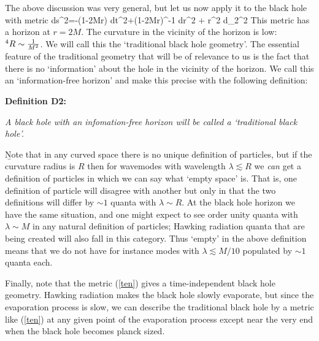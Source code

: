 \documentclass[12pt]{article}
\begin{document}
The above discussion was very general, but let us now apply it to the black hole with metric
\be
ds^2=-(1-{2M\over r}) dt^2+(1-{2M\over r})^{-1} dr^2 + r^2 d\Omega_2^2
\label{ten}
\ee
This metric has a horizon at $r=2M$. The curvature in the vicinity of the horizon is low: ${}^4R\sim {1\over M^2}$. We will call this the `traditional black hole geometry'. The essential feature of the traditional geometry that will be of relevance to us is the fact that  there is no `information' about the hole in the vicinity of the horizon. We call this an `information-free horizon' and make this precise with the following definition:

\b

{\bf Definition D2:} 

\b

{\it A black hole with an infomation-free horizon will be called a `traditional black hole'.}

\b

 Note that in any curved space there is no unique definition of particles, but if the curvature radius is $R$ then for wavemodes with wavelength $\lambda \lesssim R$ we {\it can} get a definition of particles in which we can say what `empty space' is. That is, one definition of particle will disagree with another but only in that the two definitions will differ by $\sim 1$  quanta with $\lambda \sim R$.  At the black hole horizon we have the same situation, and one might expect to see order unity quanta with $\lambda\sim M$ in any natural definition of particles; Hawking radiation quanta that are being created will also fall in this category.  Thus `empty' in the above definition means that we do not have for instance modes with $\lambda \lesssim M/10$ populated by $\sim 1$ quanta each.
 
 Finally, note that the metric (\ref{ten}) gives a time-independent black hole geometry. Hawking radiation makes the black hole slowly evaporate, but since the evaporation process is slow, we can describe the traditional black hole by a  metric like (\ref{ten}) at any given point of the evaporation process except near the very end when the black hole becomes planck sized.
 
\end{document}
